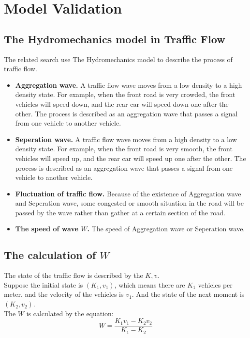 \documentclass{mcmthesis}
\begin{document}
\section{Model Validation}
\subsection{The Hydromechanics model in Traffic Flow}
The related search use The Hydromechanics model to describe the process of traffic flow.
\begin{itemize}
\item{\textbf{Aggregation wave.} A traffic flow wave moves from a low density to a high density state. For example, when the front road is very crowded, the front vehicles will speed down, and the rear car will speed down one after the other. The process is described as an aggregation wave that passes a signal from one vehicle to another vehicle.}
\end{itemize}
\begin{itemize}
\item{\textbf{Seperation wave.} A traffic flow wave moves from a high density to a low density state. For example, when the front road is very smooth, the front vehicles will speed up, and the rear car will speed up one after the other. The process is described as an aggregation wave that passes a signal from one vehicle to another vehicle.}
\end{itemize}
\begin{itemize}
\item{\textbf{Fluctuation of traffic flow.} Because of the existence of Aggregation wave and Seperation wave, some congested or smooth situation in the road will be passed by the wave rather than gather at a certain section of the road.}
\end{itemize}
\begin{itemize}
\item{\textbf{The speed of wave $W$.} The speed of Aggregation wave or Seperation wave.}
\end{itemize}
\subsection{The calculation of $W$}
\indent The state of the traffic flow is described by the $K,v$.\\
\indent Suppose the initial state is $(K_{1}, v_{1})$, which means there are $K_{1}$ vehicles per meter, and the velocity of the vehicles is $v_{1}$. And the state of the next moment is $(K_{2}, v_{2})$. \\
\indent The $W$ is calculated by the equation:
\begin{equation}
	W=\frac{K_{1}v_{1}-K_{2}v_{2}}{K_{1}-K_{2}}
\end{equation}
\end{document}
